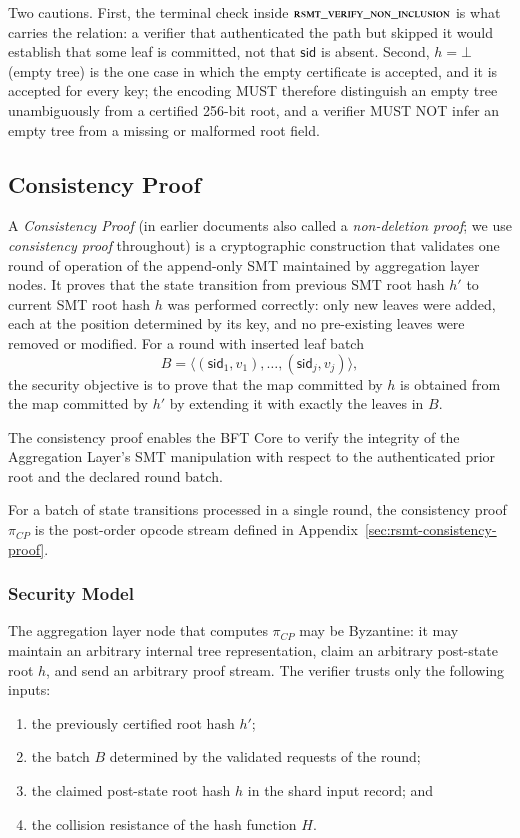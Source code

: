 Two cautions. First, the terminal check inside $\textsc{rsmt\_verify\_non\_inclusion}$ is what carries the relation: a verifier that authenticated the path but skipped it would establish that some leaf is committed, not that $\mathsf{sid}$ is absent. Second, $h = \bot$ (empty tree) is the one case in which the empty certificate is accepted, and it is accepted for every key; the encoding MUST therefore distinguish an empty tree unambiguously from a certified 256-bit root, and a verifier MUST NOT infer an empty tree from a missing or malformed root field.


\subsection{Consistency Proof}\label{sec:consistency-proof}

A \emph{Consistency Proof} (in earlier documents also called a \emph{non-deletion proof}; we use \emph{consistency proof} throughout) is a cryptographic construction that validates one round of operation of the append-only SMT maintained by aggregation layer nodes. It proves that the state transition from previous SMT root hash $h'$ to current SMT root hash $h$ was performed correctly: only new leaves were added, each at the position determined by its key, and no pre-existing leaves were removed or modified. For a round with inserted leaf batch
\[
B = \langle (\mathsf{sid}_1, v_1), \ldots, (\mathsf{sid}_j, v_j) \rangle,
\]
the security objective is to prove that the map committed by $h$ is obtained from the map committed by $h'$ by extending it with exactly the leaves in $B$.

The consistency proof enables the BFT Core to verify the integrity of the Aggregation Layer's SMT manipulation with respect to the authenticated prior root and the declared round batch.

For a batch of state transitions processed in a single round, the consistency proof $\pi_{CP}$ is the post-order opcode stream defined in Appendix~\ref{sec:rsmt-consistency-proof}.

\subsubsection{Security Model}

The aggregation layer node that computes $\pi_{CP}$ may be Byzantine: it may maintain an arbitrary internal tree representation, claim an arbitrary post-state root $h$, and send an arbitrary proof stream. The verifier trusts only the following inputs:
\begin{enumerate}
	\item the previously certified root hash $h'$;
	\item the batch $B$ determined by the validated requests of the round;
	\item the claimed post-state root hash $h$ in the shard input record; and
	\item the collision resistance of the hash function $H$.
\end{enumerate}

